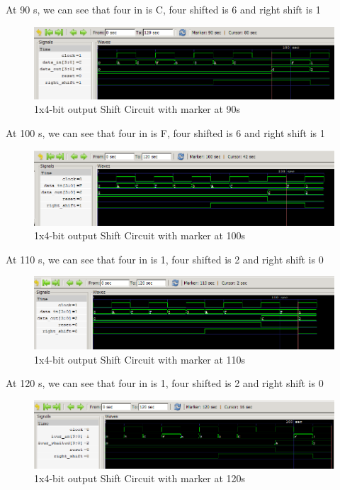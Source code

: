 \documentclass[12pt]{article}
\begin{document}
At 90 s, we can see that four in is C, four shifted is 6 and right shift is 1
\begin{figure}[h]
    \centering
    \includegraphics[width = 1.0\textwidth]{figs/Shift90.png}
    \caption{1x4-bit output Shift Circuit with marker at 90s}
    \label{fig:enter-label}
\end{figure}

At 100 s, we can see that four in is F, four shifted is 6 and right shift is 1
\begin{figure}[h]
    \centering
    \includegraphics[width = 1.0\textwidth]{figs/Shift100.png}
    \caption{1x4-bit output Shift Circuit with marker at 100s}
    \label{fig:enter-label}
\end{figure}

\newpage

At 110 s, we can see that four in is 1, four shifted is 2 and right shift is 0
\begin{figure}[h]
    \centering
    \includegraphics[width = 1.0\textwidth]{figs/Shift110.png}
    \caption{1x4-bit output Shift Circuit with marker at 110s}
    \label{fig:enter-label}
\end{figure}

At 120 s, we can see that four in is 1, four shifted is 2 and right shift is 0
\begin{figure}[h]
    \centering
    \includegraphics[width = 1.0\textwidth]{figs/Shift120.png}
    \caption{1x4-bit output Shift Circuit with marker at 120s}
    \label{fig:enter-label}
\end{figure}
\end{document}
